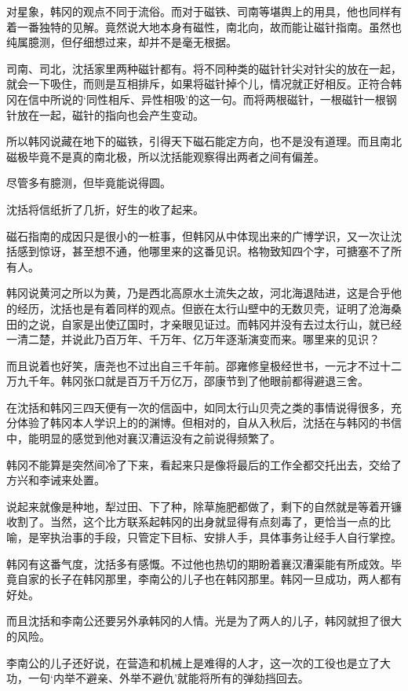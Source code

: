 对星象，韩冈的观点不同于流俗。而对于磁铁、司南等堪舆上的用具，他也同样有着一番独特的见解。竟然说大地本身有磁性，南北向，故而能让磁针指南。虽然也纯属臆测，但仔细想过来，却并不是毫无根据。

司南、司北，沈括家里两种磁针都有。将不同种类的磁针针尖对针尖的放在一起，就会一下吸住，而则是互相排斥，如果将磁针掉个儿，情况就正好相反。正符合韩冈在信中所说的‘同性相斥、异性相吸’的这一句。而将两根磁针，一根磁针一根钢针放在一起，磁针的指向也会产生变动。

所以韩冈说藏在地下的磁铁，引得天下磁石能定方向，也不是没有道理。而且南北磁极毕竟不是真的南北极，所以沈括能观察得出两者之间有偏差。

尽管多有臆测，但毕竟能说得圆。

沈括将信纸折了几折，好生的收了起来。

磁石指南的成因只是很小的一桩事，但韩冈从中体现出来的广博学识，又一次让沈括感到惊讶，甚至想不通，他哪里来的这番见识。格物致知四个字，可搪塞不了所有人。

韩冈说黄河之所以为黄，乃是西北高原水土流失之故，河北海退陆进，这是合乎他的经历，沈括也是有着同样的观点。但嵌在太行山壁中的无数贝壳，证明了沧海桑田的之说，自家是出使辽国时，才亲眼见证过。而韩冈并没有去过太行山，就已经一清二楚，并说此乃百万年、千万年、亿万年逐渐演变而来。哪里来的见识？

而且说着也好笑，唐尧也不过出自三千年前。邵雍修皇极经世书，一元才不过十二万九千年。韩冈张口就是百万千万亿万，邵康节到了他眼前都得避退三舍。

在沈括和韩冈三四天便有一次的信函中，如同太行山贝壳之类的事情说得很多，充分体验了韩冈本人学识上的的渊博。但相对的，自从入秋后，沈括在与韩冈的书信中，能明显的感觉到他对襄汉漕运没有之前说得频繁了。

韩冈不能算是突然间冷了下来，看起来只是像将最后的工作全都交托出去，交给了方兴和李诫来处置。

说起来就像是种地，犁过田、下了种，除草施肥都做了，剩下的自然就是等着开镰收割了。当然，这个比方联系起韩冈的出身就显得有点刻毒了，更恰当一点的比喻，是宰执治事的手段，只管定下目标、安排人手，具体事务让经手人自行掌控。

韩冈有这番气度，沈括多有感慨。不过他也热切的期盼着襄汉漕渠能有所成效。毕竟自家的长子在韩冈那里，李南公的儿子也在韩冈那里。韩冈一旦成功，两人都有好处。

而且沈括和李南公还要另外承韩冈的人情。光是为了两人的儿子，韩冈就担了很大的风险。

李南公的儿子还好说，在营造和机械上是难得的人才，这一次的工役也是立了大功，一句‘内举不避亲、外举不避仇’就能将所有的弹劾挡回去。

